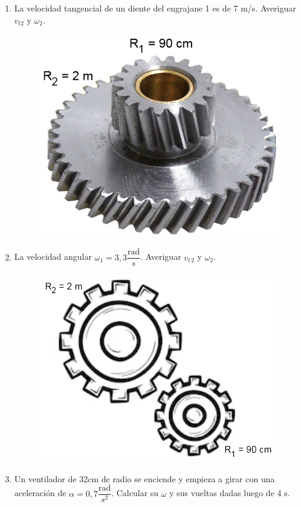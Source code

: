 \begin{enumerate}[label=\arabic*)]
\item La velocidad tangencial de un diente del engrajane 1 es de 7 m/s. Averiguar $v_{t2}$ y $\omega_2$.

\begin{figure}[H]
    \centering
    \includegraphics[width=0.3\linewidth]{images/engranaje_1.png}
\end{figure}

\item La velocidad angular $\omega_1 = 3,3\dfrac{\text{rad}}{s}$. Averiguar $v_{t\,2}$ y $\omega_2$.

\begin{figure}[H]
    \centering
    \includegraphics[width=0.4\linewidth]{images/engranaje_2.png}
\end{figure}

\item Un ventilador de 32cm de radio se enciende y empieza a girar con una aceleración de $\alpha = 0,7 \dfrac{\text{rad}}{s^2}$. Calcular su $\omega$ y sus vueltas dadas luego de 4 s.
    
\end{enumerate}
